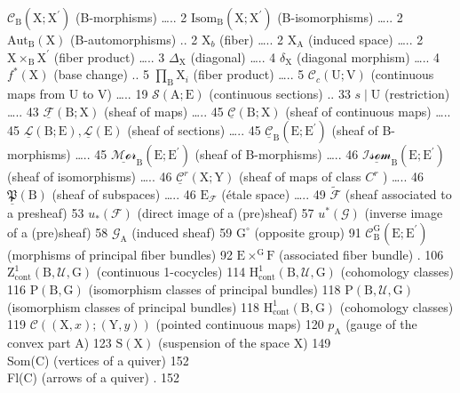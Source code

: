 
\(\mathcal{C}_{\mathrm{B}}(\mathrm{X};\mathrm{X}^{\prime})\) (B-morphisms) \ldots.. 2 \(\mathrm{Isom}_{\mathrm{B}}(\mathrm{X};\mathrm{X}^{\prime})\) (B-isomorphisms) \ldots.. 2 \(\mathrm{Aut}_{\mathrm{B}}(\mathrm{X})\) (B-automorphisms) .. 2 \(\mathrm{X}_{b}\) (fiber) \ldots.. 2 \(\mathrm{X}_{\mathrm{A}}\) (induced space) \ldots.. 2 \(\mathrm{X} \times_{\mathrm{B}} \mathrm{X}^{\prime}\) (fiber product) \ldots.. 3 \(\Delta_{\mathrm{X}}\) (diagonal) \ldots.. 4 \(\delta_{\mathrm{X}}\) (diagonal morphism) \ldots.. 4 \(f^{*}(\mathrm{X})\) (base change) .. 5 \(\prod_{\mathrm{B}} \mathrm{X}_{i}\) (fiber product) \ldots.. 5 \(\mathcal{C}_{c}(\mathrm{U};\mathrm{V})\) (continuous maps from U to V) \ldots.. 19 \(\mathcal{S}(\mathrm{A};\mathrm{E})\) (continuous sections) .. 33 \(s \mid \mathrm{U}\) (restriction) \ldots.. 43 \(\underline{\mathcal{F}}(\mathrm{B};\mathrm{X})\) (sheaf of maps) \ldots.. 45 \(\underline{\mathcal{C}}(\mathrm{B};\mathrm{X})\) (sheaf of continuous maps) \ldots.. 45 \(\underline{\mathcal{L}}(\mathrm{B};\mathrm{E}), \underline{\mathcal{L}}(\mathrm{E})\) (sheaf of sections) \ldots.. 45 \(\underline{\mathcal{C}}_{\mathrm{B}}(\mathrm{E};\mathrm{E}^{\prime})\) (sheaf of B-morphisms) \ldots.. 45 \(\underline{\mathcal{Mor}}_{\mathrm{B}}(\mathrm{E};\mathrm{E}^{\prime})\) (sheaf of B-morphisms) \ldots.. 46 \(\underline{\mathcal{Isom}}_{\mathrm{B}}(\mathrm{E};\mathrm{E}^{\prime})\) (sheaf of isomorphisms) \ldots.. 46 \(\underline{\mathcal{C}}^{r}(\mathrm{X};\mathrm{Y})\) (sheaf of maps of class \(C^{r}\) ) \ldots.. 46 \(\underline{\mathfrak{P}}(\mathrm{B})\) (sheaf of subspaces) \ldots.. 46 \(\mathrm{E}_{\mathcal{F}}\) (étale space) \ldots.. 49 \(\widetilde{\mathcal{F}}\) (sheaf associated to a presheaf) 53 \(u_{*}(\mathcal{F})\) (direct image of a (pre)sheaf) 57 \(u^{*}(\mathcal{G})\) (inverse image of a (pre)sheaf) 58 \(\mathcal{G}_{\mathrm{A}}\) (induced sheaf) 59 \(\mathrm{G}^{\circ}\) (opposite group) 91 \(\mathcal{C}_{\mathrm{B}}^{\mathrm{G}}(\mathrm{E};\mathrm{E}^{\prime})\) (morphisms of principal fiber bundles) 92 \(\mathrm{E} \times^{\mathrm{G}} \mathrm{F}\) (associated fiber bundle) . 106 \(\mathrm{Z}_{\mathrm{cont}}^{1}(\mathrm{B},\mathcal{U},\mathrm{G})\) (continuous 1-cocycles) 114 \(\mathrm{H}_{\mathrm{cont}}^{1}(\mathrm{B},\mathcal{U},\mathrm{G})\) (cohomology classes) 116 \(\mathrm{P}(\mathrm{B},\mathrm{G})\) (isomorphism classes of principal bundles) 118 \(\mathrm{P}(\mathrm{B},\mathcal{U},\mathrm{G})\) (isomorphism classes of principal bundles) 118 \(\mathrm{H}_{\mathrm{cont}}^{1}(\mathrm{B},\mathrm{G})\) (cohomology classes) 119 \(\mathcal{C}((\mathrm{X},x);(\mathrm{Y},y))\) (pointed continuous maps) 120 \(p_{\mathrm{A}}\) (gauge of the convex part A) 123 \(\mathrm{S}(\mathrm{X})\) (suspension of the space X) 149\\
Som(C) (vertices of a quiver) 152\\
Fl(C) (arrows of a quiver) . 152

